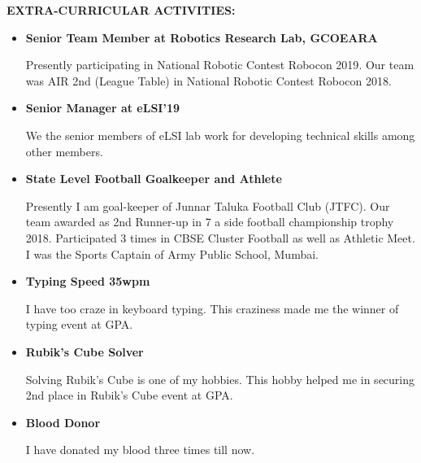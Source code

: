 \documentclass[a4paper, 10pt]{article}
\begin{document}
{\textbf{\Large{EXTRA-CURRICULAR ACTIVITIES:}}}
\begin{itemize}
\item \textbf{Senior Team Member at Robotics Research Lab, GCOEARA}

Presently participating in National Robotic Contest Robocon 2019$.$ Our team was AIR 2nd (League Table) in National Robotic Contest Robocon 2018.
\item \textbf{Senior Manager at eLSI'19}

We the senior members of eLSI lab work for developing technical skills among other members.
\item \textbf{State Level Football Goalkeeper and Athlete}

Presently I am goal-keeper of Junnar Taluka Football Club (JTFC)$.$ Our team awarded as 2nd Runner-up in 7 a side football championship trophy 2018$.$ Participated 3 times in CBSE Cluster Football as well as Athletic Meet$.$ I was the Sports Captain of Army Public School, Mumbai. 
\item \textbf{Typing Speed 35wpm}

I have too craze in keyboard typing$.$ This craziness made me the winner of typing event at GPA.
\item \textbf{Rubik's Cube Solver}

Solving Rubik's Cube is one of my hobbies$.$ This hobby helped me in securing 2nd place in Rubik's Cube event at GPA.
\item \textbf{Blood Donor}

I have donated my blood three times till now.\\
\end{itemize}
\end{document}
